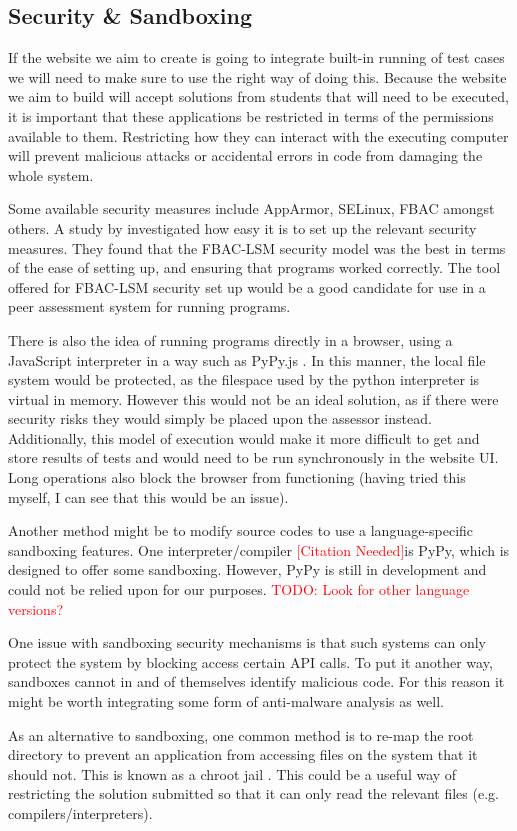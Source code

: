 \documentclass[a4paper,11pt]{report}
\newcommand{\cn}{\textcolor{red}{[Citation Needed]}}
\newcommand{\todo}[1]{\textcolor{red}{TODO: #1}}
\begin{document}
\subsection{Security \& Sandboxing}
If the website we aim to create is going to integrate built-in running of test cases we will need to make sure to use the right way of doing this. Because the website we aim to build will accept solutions from students that will need to be executed, it is important that these applications be restricted in terms of the permissions available to them. Restricting how they can interact with the executing computer will prevent malicious attacks or accidental errors in code from damaging the whole system.\par
Some available security measures include AppArmor, SELinux, FBAC amongst others. A study by \cite{schreuders_empowering_2011} investigated how easy it is to set up the relevant security measures. They found that the FBAC-LSM security model was the best in terms of the ease of setting up, and ensuring that programs worked correctly. The tool offered for FBAC-LSM security set up would be a good candidate for use in a peer assessment system for running programs.\par
There is also the idea of running programs directly in a browser, using a JavaScript interpreter in a way such as PyPy.js \cite{pypy_web_2016}. In this manner, the local file system would be protected, as the filespace used by the python interpreter is virtual in memory. However this would not be an ideal solution, as if there were security risks they would simply be placed upon the assessor instead. Additionally, this model of execution would make it more difficult to get and store results of tests and would need to be run synchronously in the website UI. Long operations also block the browser from functioning (having tried this myself, I can see that this would be an issue).\par
Another method might be to modify source codes to use a language-specific sandboxing features. One interpreter/compiler \cn is PyPy, which is designed to offer some sandboxing. However, PyPy is still in development and could not be relied upon for our purposes. \todo{Look for other language versions?}\par
One issue with sandboxing security mechanisms is that such systems can only protect the system by blocking access certain API calls. To put it another way, sandboxes cannot in and of themselves identify malicious code. For this reason it might be worth integrating some form of anti-malware analysis as well.\par
As an alternative to sandboxing, one common method is to re-map the root directory to prevent an application from accessing files on the system that it should not. This is known as a chroot jail \cite{ubuntu_basic_2016}. This could be a useful way of restricting the solution submitted so that it can only read the relevant files (e.g. compilers/interpreters).
\end{document}
